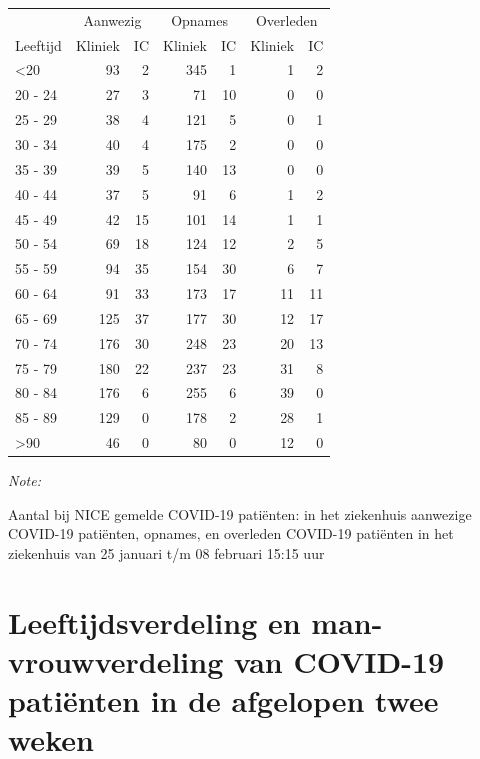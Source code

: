 \documentclass[
  english,
  man,floatsintext]{apa6}
\begin{document}
\begin{table}
\centering\begingroup\fontsize{10}{12}\selectfont

\begin{threeparttable}
\begin{tabular}{lrrrrrr}
\toprule
\multicolumn{1}{c}{ } & \multicolumn{2}{c}{Aanwezig} & \multicolumn{2}{c}{Opnames} & \multicolumn{2}{c}{Overleden} \\
\cmidrule(l{3pt}r{3pt}){2-3} \cmidrule(l{3pt}r{3pt}){4-5} \cmidrule(l{3pt}r{3pt}){6-7}
Leeftijd & Kliniek & IC & Kliniek & IC & Kliniek & IC\\
\midrule
<20 & 93 & 2 & 345 & 1 & 1 & 2\\
20 - 24 & 27 & 3 & 71 & 10 & 0 & 0\\
25 - 29 & 38 & 4 & 121 & 5 & 0 & 1\\
30 - 34 & 40 & 4 & 175 & 2 & 0 & 0\\
35 - 39 & 39 & 5 & 140 & 13 & 0 & 0\\
40 - 44 & 37 & 5 & 91 & 6 & 1 & 2\\
45 - 49 & 42 & 15 & 101 & 14 & 1 & 1\\
50 - 54 & 69 & 18 & 124 & 12 & 2 & 5\\
55 - 59 & 94 & 35 & 154 & 30 & 6 & 7\\
60 - 64 & 91 & 33 & 173 & 17 & 11 & 11\\
65 - 69 & 125 & 37 & 177 & 30 & 12 & 17\\
70 - 74 & 176 & 30 & 248 & 23 & 20 & 13\\
75 - 79 & 180 & 22 & 237 & 23 & 31 & 8\\
80 - 84 & 176 & 6 & 255 & 6 & 39 & 0\\
85 - 89 & 129 & 0 & 178 & 2 & 28 & 1\\
>90 & 46 & 0 & 80 & 0 & 12 & 0\\
\bottomrule
\end{tabular}
\begin{tablenotes}
\item \textit{Note: } 
\item Aantal bij NICE gemelde COVID-19 patiënten: in het ziekenhuis aanwezige COVID-19 patiënten, opnames, en overleden COVID-19 patiënten in het ziekenhuis van 25 januari t/m 08 februari 15:15 uur
\end{tablenotes}
\end{threeparttable}
\endgroup{}
\end{table}

\newpage

\hypertarget{leeftijdsverdeling-en-man-vrouwverdeling-van-covid-19-patiuxebnten-in-de-afgelopen-twee-weken}{%
\section{Leeftijdsverdeling en man-vrouwverdeling van COVID-19 patiënten in de afgelopen twee weken}\label{leeftijdsverdeling-en-man-vrouwverdeling-van-covid-19-patiuxebnten-in-de-afgelopen-twee-weken}}
\end{document}
